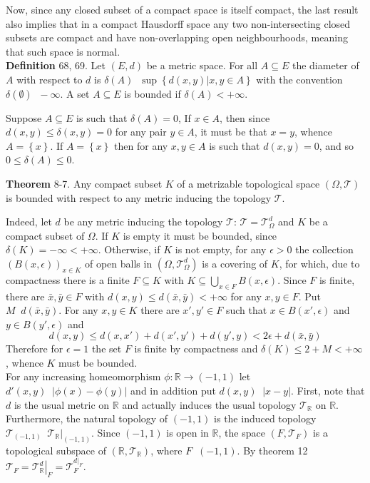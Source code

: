 \documentclass[a4paper]{article}
\newcommand{\obj}[1]{\left\{ #1 \right \}}
\newcommand{\brac}[1]{\left ( #1 \right )}
\newcommand{\induc}[1]{\left . #1 \right \vert}
\newcommand{\abs}[1]{\left | #1 \right |}
\newcommand{\Real}{\mathbb{R}}
\newcommand{\Tcal}{\mathcal{T}}
\newcommand{\defn}{\mathop{\overset{\Delta}{=}}\nolimits}
\begin{document}
Now, since any closed subset of a compact space is itself compact, the last result also implies that in a compact Hausdorff space any two non-intersecting closed subsets are compact and have non-overlapping open neighbourhoods, meaning that such space is normal.\\

\noindent \textbf{Definition} 68, 69.
Let $\brac{E, d}$ be a metric space. For all $A\subseteq E$ the diameter of $A$ with respect to $d$ is $\delta\brac{A}\defn \sup\obj{ \induc{ d\brac{x, y} } x, y\in A }$ with the convention $\delta\brac{\emptyset}\defn -\infty$. A set $A\subseteq E$ is bounded if $\delta\brac{A}<+\infty$.

Suppose $A\subseteq E$ is such that $\delta\brac{A}=0$, If $x\in A$, then since $d\brac{x,y}\leq \delta\brac{x,y} = 0$ for any pair $y\in A$, it must be that $x=y$, whence $A = \obj{x}$. If $A=\obj{x}$ then for any $x,y\in A$ is such that $d\brac{x,y}=0$, and so $0\leq \delta\brac{A}\leq 0$.

\label{thm:compact_metric_bounded} \noindent \textbf{Theorem} 8-7.
Any compact subset $K$ of a metrizable topological space $\brac{\Omega, \Tcal}$ is bounded with respect to any metric inducing the topology $\Tcal$.

Indeed, let $d$ be any metric inducing the topology $\Tcal$: $\Tcal = \Tcal_\Omega^d$ and $K$ be a compact subset of $\Omega$. If $K$ is empty it must be bounded, since $\delta\brac{K}=-\infty<+\infty$. Otherwise, if $K$ is not empty, for any $\epsilon>0$ the collection $\brac{B\brac{x, \epsilon}}_{x\in K}$ of open balls in $\brac{\Omega, \Tcal_\Omega^d}$ is a covering of $K$, for which, due to compactness there is a finite $F\subseteq K$ with $K\subseteq \bigcup_{x\in F} B\brac{x, \epsilon}$. Since $F$ is finite, there are $\bar{x},\bar{y}\in F$ with $d\brac{x,y}\leq d\brac{\bar{x},\bar{y}} < +\infty$ for any $x,y\in F$. Put $M\defn d\brac{\bar{x},\bar{y}}$. For any $x, y \in K$ there are $x', y'\in F$ such that $x\in B\brac{x', \epsilon}$ and $y\in B\brac{y', \epsilon}$ and \[d\brac{x, y}\leq d\brac{x, x'} + d\brac{x', y'} + d\brac{y', y} < 2 \epsilon + d\brac{\bar{x}, \bar{y}}\] Therefore for $\epsilon=1$ the set $F$ is finite by compactness and $\delta\brac{K}\leq 2 + M < +\infty$, whence $K$ must be bounded.\\

For any increasing homeomorphism $\phi:\Real\to \brac{-1,1}$ let $d'\brac{x,y}\defn \abs{\phi\brac{x}-\phi\brac{y}}$ and in addition put $d\brac{x,y}\defn\abs{x-y}$.
First, note that $d$ is the usual metric on $\Real$ and actually induces the usual topology $\Tcal_\Real$ on $\Real$. Furthermore, the natural topology of $\brac{-1,1}$ is the induced topology $\Tcal_{\brac{-1,1}}\defn\induc{\Tcal_\Real}_{\brac{-1,1}}$. Since $\brac{-1,1}$ is open in $\Real$, the space $\brac{F, \Tcal_F}$ is a topological subspace of $\brac{\Real, \Tcal_\Real}$, where $F\defn\brac{-1,1}$. By theorem 12 $\Tcal_F = \induc{\Tcal_\Real^d}_F = \Tcal_F^{\induc{d}_F}$.
\end{document}
